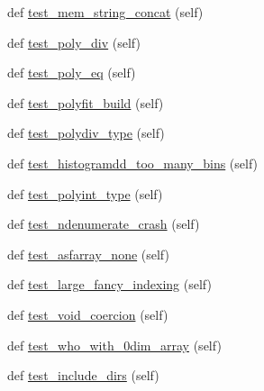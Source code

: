 \begin{DoxyCompactItemize}
\item 
def \hyperlink{classnumpy_1_1lib_1_1tests_1_1test__regression_1_1TestRegression_aa5781eb65bdab76e7be60a39b052ba6b}{test\+\_\+mem\+\_\+string\+\_\+concat} (self)
\item 
def \hyperlink{classnumpy_1_1lib_1_1tests_1_1test__regression_1_1TestRegression_a3ee572dd5cc6f876ea30aa8cdafddd29}{test\+\_\+poly\+\_\+div} (self)
\item 
def \hyperlink{classnumpy_1_1lib_1_1tests_1_1test__regression_1_1TestRegression_ace6482b4052dda3177d8a59791ff19ee}{test\+\_\+poly\+\_\+eq} (self)
\item 
def \hyperlink{classnumpy_1_1lib_1_1tests_1_1test__regression_1_1TestRegression_a32e82a089e374bdef0e10a6849e707b0}{test\+\_\+polyfit\+\_\+build} (self)
\item 
def \hyperlink{classnumpy_1_1lib_1_1tests_1_1test__regression_1_1TestRegression_a9b7df9bc1be939cb47fd8dca4997db60}{test\+\_\+polydiv\+\_\+type} (self)
\item 
def \hyperlink{classnumpy_1_1lib_1_1tests_1_1test__regression_1_1TestRegression_a9296886e52af14634d1ec3175ce1d21b}{test\+\_\+histogramdd\+\_\+too\+\_\+many\+\_\+bins} (self)
\item 
def \hyperlink{classnumpy_1_1lib_1_1tests_1_1test__regression_1_1TestRegression_a1622400afabfc6b2479ad7f853852755}{test\+\_\+polyint\+\_\+type} (self)
\item 
def \hyperlink{classnumpy_1_1lib_1_1tests_1_1test__regression_1_1TestRegression_a6d1c89ccd145971b852d38c416172222}{test\+\_\+ndenumerate\+\_\+crash} (self)
\item 
def \hyperlink{classnumpy_1_1lib_1_1tests_1_1test__regression_1_1TestRegression_aced549be4b7d3d88c1973eb020f7e25f}{test\+\_\+asfarray\+\_\+none} (self)
\item 
def \hyperlink{classnumpy_1_1lib_1_1tests_1_1test__regression_1_1TestRegression_a3e9d058f779c9190d8e40f6b5ce6bb22}{test\+\_\+large\+\_\+fancy\+\_\+indexing} (self)
\item 
def \hyperlink{classnumpy_1_1lib_1_1tests_1_1test__regression_1_1TestRegression_acd86bbfca27c817d23f30f0d1e8d90a2}{test\+\_\+void\+\_\+coercion} (self)
\item 
def \hyperlink{classnumpy_1_1lib_1_1tests_1_1test__regression_1_1TestRegression_a01701e041a9fbea92723825bad522d94}{test\+\_\+who\+\_\+with\+\_\+0dim\+\_\+array} (self)
\item 
def \hyperlink{classnumpy_1_1lib_1_1tests_1_1test__regression_1_1TestRegression_a3094062385f07594ebccefe518e2ef49}{test\+\_\+include\+\_\+dirs} (self)

\end{DoxyCompactItemize}
